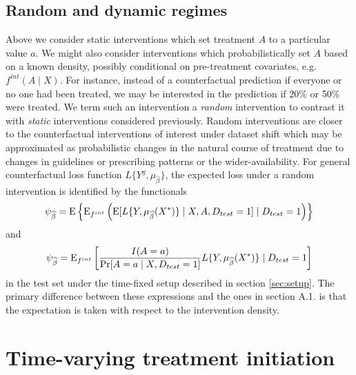     \subsection{Random and dynamic regimes}\label{sec:randomdynamic}
    Above we consider static interventions which set treatment $A$ to a particular value $a$. We might also consider interventions which probabilistically set $A$ based on a known density, possibly conditional on pre-treatment covariates, e.g. $f^{int}(A \mid X)$. For instance, instead of a counterfactual prediction if everyone or no one had been treated, we may be interested in the prediction if 20\% or 50\% were treated. We term such an intervention a \textit{random} intervention to contrast it with \textit{static} interventions considered previously. Random interventions are closer to the counterfactual interventions of interest under dataset shift which may be approximated as probabilistic changes in the natural course of treatment due to changes in guidelines or prescribing patterns or the wider-availability. For general counterfactual loss function $L\{Y^{g}, \mu_{\widehat{\beta}}\}$, the expected loss under a random intervention is identified by the functionals
    \begin{equation}\label{eqn:rand_cl_estimand}
        \psi_{\widehat{\beta}} = \operatorname{E}\left\{\operatorname{E}_{f^{int}}\left(\operatorname{E}[L\{Y, \mu_{\widehat{\beta}}(X^*)\} \mid X, A, D_{test} = 1] \mid D_{test} = 1\right)\right\}
    \end{equation}
    and 
    \begin{equation}\label{eqn:rand_ipw_estimand}
        \psi_{\widehat{\beta}} = \operatorname{E}_{f^{int}}\left[\frac{I(A = a)}{\Pr[A = a \mid X, D_{test} = 1]}L\{Y, \mu_{\widehat{\beta}}(X^*)\} \mid D_{test} = 1\right]
    \end{equation}
    in the test set under the time-fixed setup described in section \ref{sec:setup}. The primary difference between these expressions and the ones in section A.1. is that the expectation is taken with respect to the intervention density. 


\section{Time-varying treatment initiation}\label{sec:timevarying}
